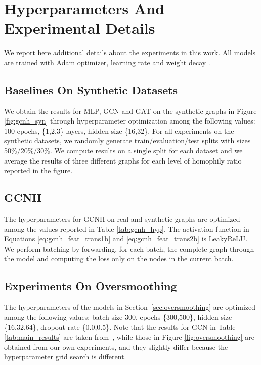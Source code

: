 \documentclass[conference]{IEEEtran}
\begin{document}
\section{Hyperparameters And Experimental Details}
\label{app:hyp}
We report here additional details about the experiments in this work. All models are trained with Adam optimizer, learning rate  and weight decay . 
\subsection{Baselines On Synthetic Datasets}
\label{app:baselines_syn_hyp}
We obtain the results for MLP, GCN and GAT on the synthetic graphs in Figure \ref{fig:gcnh_syn} through hyperparameter optimization among the following values: 100 epochs, \{1,2,3\} layers, hidden size \{16,32\}. For all experiments on the synthetic datasets, we randomly generate train/evaluation/test splits with sizes 50\%/20\%/30\%. We compute results on a single split for each dataset and we average the results of three different graphs for each level of homophily ratio reported in the figure.
\subsection{GCNH}
\label{app:gcnh_hyp}
The hyperparameters for GCNH on real and synthetic graphs are optimized among the values reported in Table \ref{tab:gcnh_hyp}. The activation function  in Equations \ref{eq:gcnh_feat_trans1b} and \ref{eq:gcnh_feat_trans2b} is LeakyReLU. We perform batching by forwarding, for each batch, the complete graph through the model and computing the loss only on the nodes in the current batch.

\subsection{Experiments On Oversmoothing}\label{app:sec:oversmoothing}
The hyperparameters of the models in Section~\ref{sec:oversmoothing} are optimized among the following values: batch size 300, epochs \{300,500\}, hidden size \{16,32,64\}, dropout rate \{0.0,0.5\}. Note that the results for GCN in Table \ref{tab:main_results} are taken from~\cite{yan_two_2021}, while those in Figure \ref{fig:oversmoothing} are obtained from our own experiments, and they slightly differ because the hyperparameter grid search is different.
\end{document}
